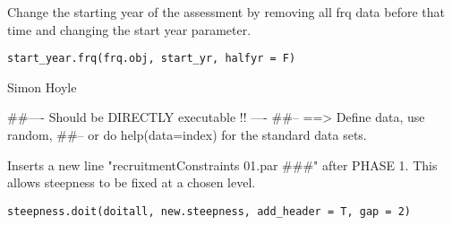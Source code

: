 \documentclass[a4paper]{book}
\begin{document}
%
\begin{Description}\relax

Change the starting year of the assessment by removing all frq data before that time and changing the start year parameter. 
\end{Description}
%
\begin{Usage}
\begin{verbatim}
start_year.frq(frq.obj, start_yr, halfyr = F)
\end{verbatim}
\end{Usage}
%
\begin{Arguments}
\begin{ldescription}
\item[\code{frq.obj}] 


\item[\code{start\_yr}] 


\item[\code{halfyr}] 


\end{ldescription}
\end{Arguments}
%
\begin{Author}\relax

Simon Hoyle
\end{Author}
%
\begin{Examples}
\begin{ExampleCode}
##---- Should be DIRECTLY executable !! ----
##-- ==>  Define data, use random,
##--	or do  help(data=index)  for the standard data sets.

\end{ExampleCode}
\end{Examples}
%
\begin{Description}\relax

Inserts a new line "recruitmentConstraints 01.par \#\#\#" after PHASE 1. 
This allows steepness to be fixed at a chosen level. 

\end{Description}
%
\begin{Usage}
\begin{verbatim}
steepness.doit(doitall, new.steepness, add_header = T, gap = 2)
\end{verbatim}
\end{Usage}
\end{document}
